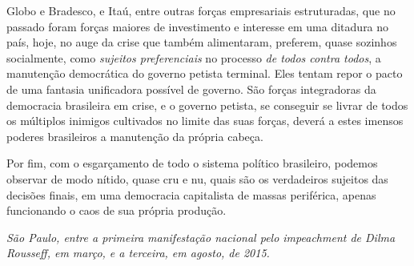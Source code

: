 Globo e Bradesco, e Itaú, entre outras forças empresariais estruturadas,
que no passado foram forças maiores de investimento e interesse em uma
ditadura no país, hoje, no auge da crise que também alimentaram,
preferem, quase sozinhos socialmente, como \emph{sujeitos preferenciais}
no processo \emph{de todos contra todos}, a manutenção democrática do
governo petista terminal. Eles tentam repor o pacto de uma fantasia
unificadora possível de governo. São forças integradoras da democracia
brasileira em crise, e o governo petista, se conseguir se livrar de
todos os múltiplos inimigos cultivados no limite das suas forças, deverá
a estes imensos poderes brasileiros a manutenção da própria cabeça.

Por fim, com o esgarçamento de todo o sistema político brasileiro,
podemos observar de modo nítido, quase cru e nu, quais são os
verdadeiros sujeitos das decisões finais, em uma democracia capitalista
de massas periférica, apenas funcionando o caos de sua própria produção.

\bigskip\hfill\begin{minipage}{.7\textwidth}
\emph{São Paulo, entre a primeira manifestação nacional pelo impeachment
de Dilma Rousseff, em março, e a terceira, em agosto, de 2015.}
\end{minipage}
